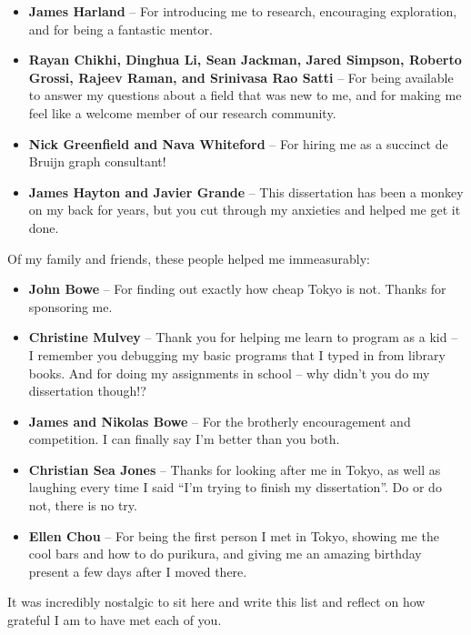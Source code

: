 \begin{itemize}
\item \textbf{James Harland} -- For introducing me to research, encouraging exploration, and for being a fantastic mentor.
\item \textbf{Rayan Chikhi, Dinghua Li, Sean Jackman, Jared Simpson, Roberto Grossi, Rajeev Raman, and Srinivasa Rao Satti} -- For being available to answer my questions about a field that was new to me, and for making me feel like a welcome member of our research community.
\item \textbf{Nick Greenfield and Nava Whiteford} -- For hiring me as a succinct de Bruijn graph consultant!
\item \textbf{James Hayton and Javier Grande} -- This dissertation has been a monkey on my back for years, but you cut through my anxieties and helped me get it done.
\end{itemize}

Of my family and friends, these people helped me immeasurably:

\begin{itemize}
\item \textbf{John Bowe} -- For finding out exactly how cheap Tokyo is not. Thanks for sponsoring me.
\item \textbf{Christine Mulvey} -- Thank you for helping me learn to program as a kid -- I remember you debugging my basic programs that I typed in from library books. And for doing my assignments in school -- why didn’t you do my dissertation though!?
\item \textbf{James and Nikolas Bowe} -- For the brotherly encouragement and competition. I can finally say I’m better than you both.
\item \textbf{Christian Sea Jones} -- Thanks for looking after me in Tokyo, as well as laughing every time I said “I’m trying to finish my dissertation”. Do or do not, there is no try.
\item \textbf{Ellen Chou} -- For being the first person I met in Tokyo, showing me the cool bars and how to do purikura, and giving me an amazing birthday present a few days after I moved there.
\end{itemize}

It was incredibly nostalgic to sit here and write this list and reflect on how grateful I am to have met each of you.
